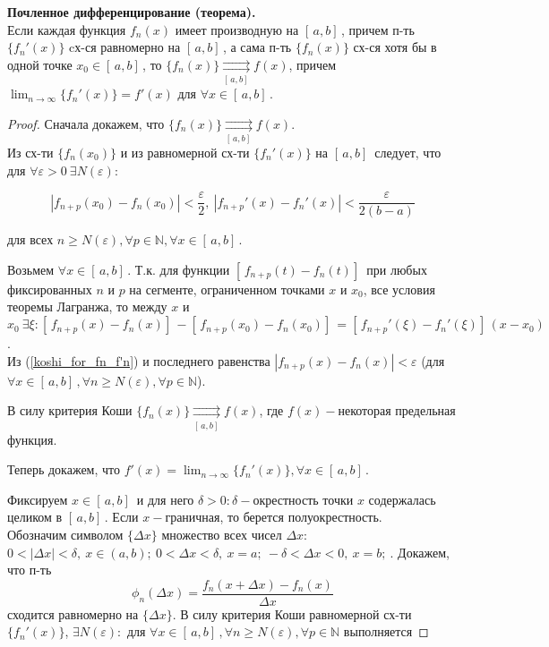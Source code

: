 \bigbreak
\textbf{Почленное дифференцирование (теорема).} \\
Если каждая функция $f_n(x)$ имеет производную на $[\,a,b]\,$, причем п-ть $\{f_n'(x)\}$ cх-ся равномерно на $[\,a,b]\,$, а сама п-ть $\{f_n(x)\}$ сх-ся хотя бы в одной точке $x_0 \in [\,a,b]\,$, то $\{f_n(x)\} \underset{[\,a,b]\, }{\rightrightarrows}f(x)$, причем $\lim_{n \rightarrow \infty}{\{f_n'(x)\}} = f'(x)$ для $\forall x \in [\,a,b]\,$.

\begin{proof}
    Сначала докажем, что $\{f_n(x)\} \underset{[\,a,b]\, }{\rightrightarrows}f(x)$. \\
    Из сх-ти $\{f_n(x_0)\}$ и из равномерной сх-ти $\{f_n'(x)\}$ на $[\,a,b]\,$ следует, что для $\forall \varepsilon > 0 \ \exists N(\varepsilon):$

    \begin{equation}\label{koshi_for_fn_f'n}
        |f_{n+p}(x_0) - f_n(x_0)| < \frac{\varepsilon}{2},\ |f_{n+p}'(x) - f_n'(x)| < \frac{\varepsilon}{2(b-a)}
    \end{equation}

    для всех $n \ge N(\varepsilon), \forall p \in \mathbb{N}, \forall x \in [\,a,b]\,$.

    Возьмем $\forall x \in [\,a,b]\,$. Т.к. для функции $[\,f_{n+p}(t) - f_n(t)]\,$ при любых фиксированных $n$ и $p$ на сегменте, ограниченном точками $x$ и $x_0$, все условия теоремы Лагранжа, то между $x$ и $x_0 \ \exists \xi: [\,f_{n+p}(x) - f_n(x)]\, - [\,f_{n+p}(x_0) - f_n(x_0)]\, = [\,f_{n+p}'(\xi) - f_n'(\xi)]\,(x-x_0)$. \\

    Из (\ref{koshi_for_fn_f'n}) и последнего равенства $|f_{n+p}(x) - f_n(x)| < \varepsilon$ (для $\forall x \in [\,a,b]\,, \forall n \ge N(\varepsilon), \forall p \in \mathbb{N}$).
    
    В силу критерия Коши $\{f_n(x)\} \underset{[\,a,b]\, }{\rightrightarrows}f(x)$, где $f(x)-$некоторая предельная функция.

    Теперь докажем, что $f'(x) = \lim_{n \rightarrow \infty}{\{f_n'(x)\}}, \forall x \in [\,a,b]\,$.

    Фиксируем $x \in [\,a,b]\,$ и для него $\delta > 0: \delta-$окрестность точки $x$ содержалась целиком в $[\,a,b]\,$. Если $x-$граничная, то берется полуокрестность. \\

    Обозначим символом $\{\Delta x\}$ множество всех чисел $\Delta x$: $0 < |\Delta x| < \delta, \ x \in (a, b);\ 0 < \Delta x < \delta, \ x = a;\ -\delta < \Delta x < 0, \ x = b;\ $.
    Докажем, что п-ть
    \begin{equation}\label{phi_functions}
        \phi_n(\Delta x) = \frac{f_n(x + \Delta x) - f_n(x)}{\Delta x}
    \end{equation}
    сходится равномерно на $\{\Delta x\}$.
    В силу критерия Коши равномерной сх-ти $\{f_n'(x)\}$, $\exists N(\varepsilon):$ для $\forall x \in [\,a,b]\,, \forall n \ge N(\varepsilon), \forall p \in \mathbb{N}$ выполняется


\end{proof}
